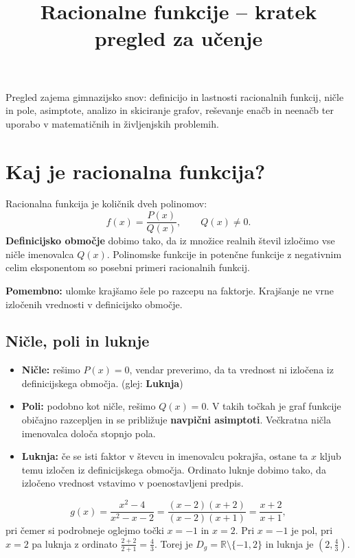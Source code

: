\documentclass[11pt]{article}
\title{Racionalne funkcije -- kratek pregled za učenje}
\date{}
\author{}
\begin{document}
\maketitle

Pregled zajema gimnazijsko snov: definicijo in lastnosti racionalnih funkcij, ničle in pole, asimptote, analizo in skiciranje grafov, reševanje enačb in neenačb ter uporabo v matematičnih in življenjskih problemih.

\section{Kaj je racionalna funkcija?}

Racionalna funkcija je količnik dveh polinomov:
\[
 f(x)=\frac{P(x)}{Q(x)},\qquad Q(x)\ne 0.
\]
\textbf{Definicijsko območje} dobimo tako, da iz množice realnih števil izločimo vse ničle imenovalca $Q(x)$. Polinomske funkcije in potenčne funkcije z negativnim celim eksponentom so posebni primeri racionalnih funkcij.

\textbf{Pomembno:} ulomke krajšamo šele po razcepu na faktorje. Krajšanje ne vrne izločenih vrednosti v definicijsko območje.

\subsection{Ničle, poli in luknje}

\begin{itemize}[leftmargin=*]
  \item \textbf{Ničle:} rešimo $P(x)=0$, vendar preverimo, da ta vrednost ni izločena iz definicijskega območja. (glej: \textbf{Luknja})
  \item \textbf{Poli:} podobno kot ničle, rešimo $Q(x)=0$. V takih točkah je graf funkcije običajno razcepljen in se približuje \textbf{navpični asimptoti}. Večkratna ničla imenovalca določa stopnjo pola.
  \item \textbf{Luknja:} če se isti faktor v števcu in imenovalcu pokrajša, ostane ta $x$ kljub temu izločen iz definicijskega območja. Ordinato luknje dobimo tako, da izločeno vrednost vstavimo v poenostavljeni predpis.
\end{itemize}

\begin{zgledbox}
\[
 g(x)=\frac{x^2-4}{x^2-x-2}=\frac{(x-2)(x+2)}{(x-2)(x+1)}=\frac{x+2}{x+1},
\]
pri čemer si podrobneje oglejmo točki $x=-1$ in $x=2$. Pri $x=-1$ je pol, pri $x=2$ pa luknja z ordinato $\frac{2+2}{2+1}=\frac{4}{3}$. Torej je $D_g=\mathbb{R}\setminus\{-1,2\}$ in luknja je $\left(2,\frac{4}{3}\right)$.
\end{zgledbox}
\end{document}
